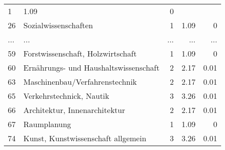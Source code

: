 \begin{longtable}{lXrrr}
          \num{1} &
          \num[round-mode=places,round-precision=2]{1.09} &
          \num[round-mode=places,round-precision=2]{0} \\
        26 & \multicolumn{1}{X}{Sozialwissenschaften} & %
          \num{1} &
          \num[round-mode=places,round-precision=2]{1.09} &
          \num[round-mode=places,round-precision=2]{0} \\
       ... & ... & ... & ... & ... \\
        59 & \multicolumn{1}{X}{Forstwissenschaft, Holzwirtschaft} & %
          \num{1} &
          \num[round-mode=places,round-precision=2]{1.09} &
          \num[round-mode=places,round-precision=2]{0} \\

        60 & \multicolumn{1}{X}{Ernährungs- und Haushaltswissenschaft} & %
          \num{2} &
          \num[round-mode=places,round-precision=2]{2.17} &
          \num[round-mode=places,round-precision=2]{0.01} \\

        63 & \multicolumn{1}{X}{Maschinenbau/Verfahrenstechnik} & %
          \num{2} &
          \num[round-mode=places,round-precision=2]{2.17} &
          \num[round-mode=places,round-precision=2]{0.01} \\

        65 & \multicolumn{1}{X}{Verkehrstechnick, Nautik} & %
          \num{3} &
          \num[round-mode=places,round-precision=2]{3.26} &
          \num[round-mode=places,round-precision=2]{0.01} \\

        66 & \multicolumn{1}{X}{Architektur, Innenarchitektur} & %
          \num{2} &
          \num[round-mode=places,round-precision=2]{2.17} &
          \num[round-mode=places,round-precision=2]{0.01} \\

        67 & \multicolumn{1}{X}{Raumplanung} & %
          \num{1} &
          \num[round-mode=places,round-precision=2]{1.09} &
          \num[round-mode=places,round-precision=2]{0} \\

        74 & \multicolumn{1}{X}{Kunst, Kunstwissenschaft allgemein} & %
          \num{3} &
          \num[round-mode=places,round-precision=2]{3.26} &
          \num[round-mode=places,round-precision=2]{0.01} \\


\end{longtable}

